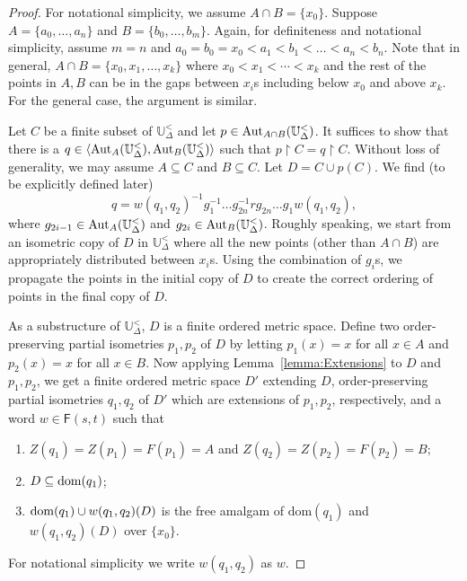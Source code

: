 \documentclass[10pt,a4paper]{amsart}
\theoremstyle{definition}
\theoremstyle{remark}
\begin{document}
     \begin{proof}
        For notational simplicity, we assume $A \cap B =\{x_0\}$. Suppose $A=\{a_0,\dots,a_n\}$ and $B=\{b_0,\dots,b_m\}$. Again, for definiteness and notational simplicity, assume $m=n$ and $a_0=b_0=x_0 < a_1 <b_1 <\dots<a_n <b_n$. Note that in general, $A \cap B =\{x_0,x_1,\dots, x_k\}$ where $x_0<x_1<\cdots<x_k$ and the rest of the points in $A,B$ can be in the gaps between $x_i$s including below $x_0$ and above $x_k$. For the general case, the argument is similar.

        Let $C$ be a finite subset of $\mathbb{U}_\Delta^<$ and let $p \in {\rm Aut}_{A\cap B}(\mathbb{U}_\Delta^<)$. It suffices to show that there is a $q \in \langle {\rm Aut}_A(\mathbb{U}_\Delta^<), {\rm Aut}_B(\mathbb{U}_\Delta^<) \rangle$ such that $p \upharpoonright C = q\upharpoonright C$. Without loss of generality, we may assume $A \subseteq C$ and $B \subseteq C$. Let $D = C \cup p(C)$. We find (to be explicitly defined later)
$$q=w(q_1,q_2)^{-1}g_1^{-1}\dots g_{2n}^{-1}rg_{2n}\dots g_1w(q_1,q_2), $$
where $g_{2i-1}\in {\rm Aut}_{A}(\mathbb{U}_\Delta^<)$ and $g_{2i}\in {\rm Aut}_{B}(\mathbb{U}_\Delta^<)$. Roughly speaking, we start from an isometric copy of $D$ in $\mathbb{U}_\Delta^<$ where all the new points (other than $A\cap B$) are appropriately distributed between $x_i$s. Using the combination of $g_i$s, we propagate the points in the initial copy of $D$ to create the correct ordering of points in the final copy of $D$.

As a substructure of $\mathbb{U}^<_\Delta$, $D$ is a finite ordered metric space. Define two order-preserving partial isometries $p_1,p_2$ of $D$ by letting $p_1(x)=x$ for all $x \in A$ and $p_2(x)=x$ for all $x \in B$. Now applying Lemma~\ref{lemma:Extensions} to $D$ and $p_1,p_2$, we get a finite ordered metric space $D'$ extending $D$, order-preserving partial isometries $q_1,q_2$ of $D'$ which are extensions of $p_1,p_2$, respectively, and a word $w \in \mathsf{F}(s,t)$ such that 
\begin{enumerate}
\item $Z(q_1)=Z(p_1)=F(p_1)=A$ and $Z(q_2)=Z(p_2)=F(p_2)=B$;
\item $D \subseteq {\rm dom}(q_1)$;
\item ${\rm dom}(q_1) \cup w(q_1,q_2)(D)$ is the free amalgam of $\mbox{dom}(q_1)$ and $w(q_1,q_2)(D)$ over $\{x_0\}$. 
\end{enumerate}
For notational simplicity we write $w(q_1,q_2)$ as $w$. 
      

\end{proof}
\end{document}
